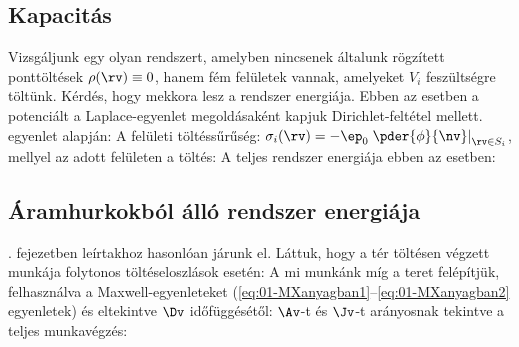   \subsection{Kapacitás}
   
   Vizsgáljunk egy olyan rendszert, amelyben nincsenek általunk rögzített ponttöltések $\rho(\rv)\equiv 0$, hanem fém felületek vannak, amelyeket $V_i$ feszültségre töltünk.
   Kérdés, hogy mekkora lesz a rendszer energiája.
   Ebben az esetben a potenciált a Laplace-egyenlet megoldásaként kapjuk Dirichlet-feltétel mellett.  egyenlet alapján:
   A felületi töltéssűrűség: $\sigma_i(\rv)=-\ep_0\left.\pder{\phi}{\nv}\right|_{\rv\in S_i}$, mellyel az adott felületen a töltés:
   A teljes rendszer energiája ebben az esetben:
   
  \subsection{Áramhurkokból álló rendszer energiája}
   
   . fejezetben leírtakhoz hasonlóan járunk el.
   Láttuk, hogy a tér töltésen végzett munkája folytonos töltéseloszlások esetén:
   A mi munkánk míg a teret felépítjük, felhasználva a Maxwell-egyenleteket (\eqref{eq:01-MXanyagban1}--\eqref{eq:01-MXanyagban2} egyenletek) és eltekintve $\Dv$ időfüggésétől:
   $\Av$-t és $\Jv$-t arányosnak tekintve a teljes munkavégzés:
   
